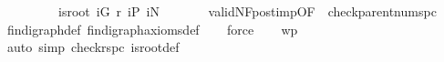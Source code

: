 \begin{isabellebody}
\ \ \ \ \ \ \ \ \ is{\isacharunderscore}root\ iG\ r\ iP\ iN{\isacharparenright}{\isachardoublequoteclose}\ \isanewline
\ \ \ \ \ \ validNF{\isacharunderscore}post{\isacharunderscore}imp{\isacharbrackleft}OF\ {\isacharunderscore}\ check{\isacharunderscore}parent{\isacharunderscore}num{\isacharunderscore}spc{\isacharprime}{\isacharbrackright}{\isacharparenright}\isanewline
\ \ \isamarkupfalse%
\ fin{\isacharunderscore}digraph{\isacharunderscore}def\ fin{\isacharunderscore}digraph{\isacharunderscore}axioms{\isacharunderscore}def\isanewline
\ \ \isamarkupfalse%
\ force\isanewline
\ \ \isamarkupfalse%
\ wp\ \isanewline
\ \ \isamarkupfalse%
\ {\isacharparenleft}auto\ simp{\isacharcolon}\ check{\isacharunderscore}r{\isacharprime}{\isacharunderscore}spc\ is{\isacharunderscore}root{\isacharunderscore}def{\isacharparenright}{\isacharbrackleft}{\isacharbrackright}\isanewline
{}\isamarkupfalse%
%
\endisatagproof
{\isafoldproof}%
%
\isadelimproof
\isanewline
%
\endisadelimproof
\isanewline
{}\isamarkupfalse%
\isanewline
%
\isadelimtheory
%
\endisadelimtheory
%
\isatagtheory
{}\isamarkupfalse%
%
\endisatagtheory
{\isafoldtheory}%
%
\isadelimtheory
%
\endisadelimtheory
\end{isabellebody}%
